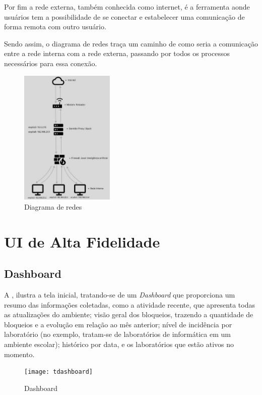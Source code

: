 \documentclass[
  a4paper,%
  12pt,%
  english,%
  brazilian,%
]{article}
\begin{document}
Por fim a rede externa, também conhecida como internet, é a ferramenta aonde usuários tem a possibilidade de se conectar e estabelecer uma comunicação de forma remota com outro usuário.

Sendo assim, o diagrama de redes traça um caminho de como seria a comunicação entre a rede interna com a rede externa, passando por todos os processos necessários para essa conexão.

\begin{figure}[H]
    \centering
    \caption{Diagrama de redes}
    \label{fig:red}
    \includegraphics[width=0.4\textwidth]{Logos/JPG-diagrama-de-redes.jpg}
\end{figure}

\section*{UI de Alta Fidelidade}
   
    
    \subsection*{Dashboard}
    A , ilustra a tela inicial, tratando-se de um \textit{Dashboard} que proporciona um resumo das informações coletadas, como a atividade recente, que apresenta todas as atualizações do ambiente; visão geral dos bloqueios, trazendo a quantidade de bloqueios e a evolução em relação ao mês anterior; nível de incidência por laboratório (no exemplo, tratam-se de laboratórios de informática em um ambiente escolar); histórico por data, e os laboratórios que estão ativos no momento.

    \begin{figure}[H]
        \centering
        \caption{Dashboard}%
        \label{fig:dashboard}
        \texttt{[image: tdashboard]}
        \end{figure}
\end{document}
